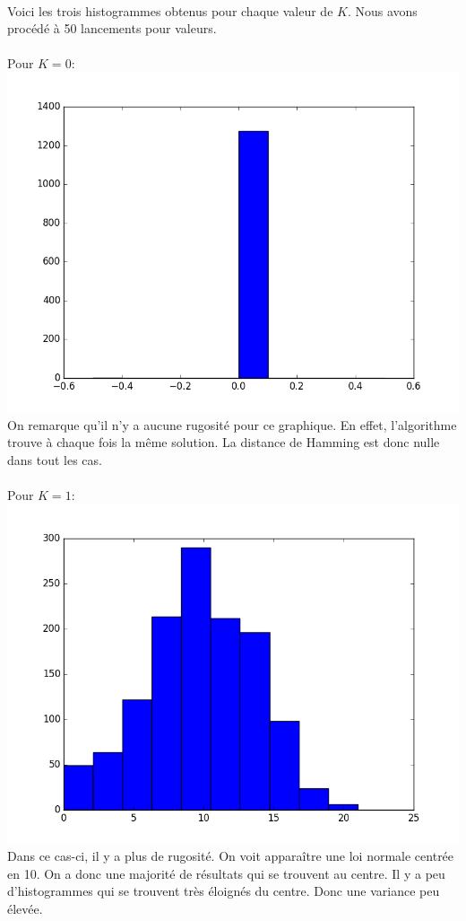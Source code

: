 \documentclass[a4paper, 11pt]{article}
\begin{document}
\paragraph{}
Voici les trois histogrammes obtenus pour chaque valeur de $K$. Nous avons procédé à 50 lancements pour valeurs.

\paragraph{}
Pour $K=0$:\\
\includegraphics[scale=0.5]{d_d_0}
\\
On remarque qu'il n'y a aucune rugosité pour ce graphique. En effet, l'algorithme trouve à chaque fois la même solution. La distance de 
Hamming est donc nulle dans tout les cas.

\paragraph{}
Pour $K=1$:\\
\includegraphics[scale=0.5]{d_d_1}
\\
Dans ce cas-ci, il y a plus de rugosité. On voit apparaître une loi normale centrée en 10. On a donc une majorité de résultats qui se 
trouvent au centre. Il y a peu d'histogrammes qui se trouvent très éloignés du centre. Donc une variance peu élevée.
\end{document}
